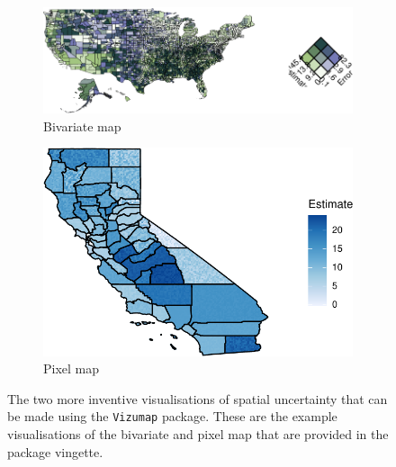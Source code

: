 \documentclass[
  letterpaper,
  DIV=11,
  numbers=noendperiod]{scrartcl}
\begin{document}
\begin{figure}

{\centering 

\begin{figure}

{\centering \includegraphics{confirmationreport_files/figure-pdf/fig-spatialuncert1-1.pdf}

}

\caption{Bivariate map}

\end{figure}

\begin{figure}

{\centering \includegraphics{confirmationreport_files/figure-pdf/fig-spatialuncert1-2.pdf}

}

\caption{Pixel map}

\end{figure}

}

\caption{\label{fig-spatialuncert1}The two more inventive visualisations
of spatial uncertainty that can be made using the \texttt{Vizumap}
package. These are the example visualisations of the bivariate and pixel
map that are provided in the package vingette.}

\end{figure}
\end{document}
